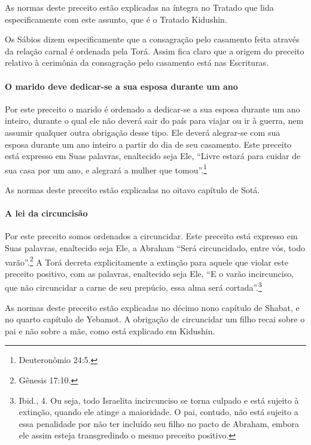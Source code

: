 As normas deste preceito estão explicadas na íntegra no Tratado que lida
especificamente com este assunto, que é o Tratado Kidushin.

Os Sábios dizem especificamente que a consagração pelo casamento feita
através da relação carnal é ordenada pela Torá. Assim fica claro que a
origem do preceito relativo à cerimônia da consagração pelo casamento está
nas Escrituras.

\paragraph{O marido deve dedicar-se a sua esposa durante um ano}

Por este preceito o marido é ordenado a dedicar-se a sua esposa durante
um ano inteiro, durante o qual ele não deverá sair do país para viajar
ou ir à guerra, nem assumir qualquer outra obrigação desse tipo. Ele
deverá alegrar-se com sua esposa durante um ano inteiro a partir do dia
de seu casamento. Este preceito está expresso em Suas palavras,
enaltecido seja Ele, ``Livre estará para cuidar de sua casa por um ano,
e alegrará a mulher que tomou''.\footnote{Deuteronômio 24:5.}

As normas deste preceito estão explicadas no oitavo capítulo de Sotá.

\paragraph{A lei da circuncisão}

Por este preceito somos ordenados a circuncidar. Este preceito está
expresso em Suas palavras, enaltecido seja Ele, a Abraham ``Será
circuncidado, entre vós, todo varão''.\footnote{Gênesis 17:10.} A Torá decreta
explicitamente a extinção para aquele que violar este preceito
positivo, com as palavras, enaltecido seja Ele, ``E o varão
incircunciso, que não circuncidar a carne de seu prepúcio, essa alma
será cortada''.\footnote{Ibid., 4. Ou seja, todo Israelita incircunciso se torna culpado e está
sujeito à extinção, quando ele atinge a maioridade. O pai, contudo, não
está sujeito a essa penalidade por não ter incluído seu filho no pacto
de Abraham, embora ele assim esteja transgredindo o mesmo preceito
positivo.}

As normas deste preceito estão explicadas no décimo nono capítulo de
Shabat, e no quarto capítulo de Yebamot. A obrigação de circuncidar um
filho recai sobre o pai e não sobre a mãe, como está explicado em
Kidushin.

